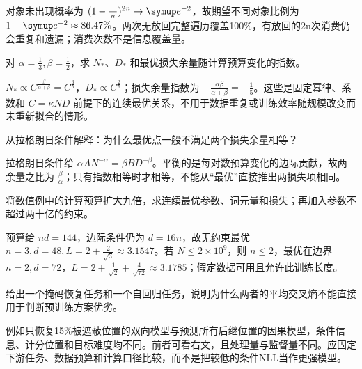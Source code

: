 \begin{exercises}
\begin{exercise}
\begin{solution}
对象未出现概率为 $(1-\frac{1}{n})^{2n}\to \conste{}^{-2}$，故期望不同对象比例为 $1-\conste{}^{-2}\approx86.47\%$。两次无放回完整遍历覆盖100\%，有放回的2n次消费仍会重复和遗漏；消费次数不是信息覆盖量。
\end{solution}
\end{exercise}

\begin{exercise} 对 $\alpha=\frac{1}{3},\beta=\frac{1}{2}$，求 $N_*$、$D_*$ 和最优损失余量随计算预算变化的指数。

\begin{solution}
$N_*\propto C^{\frac{\beta}{\alpha+\beta}}=C^{\frac{3}{5}}$，$D_*\propto C^{\frac{2}{5}}$；损失余量指数为 $-\frac{\alpha\beta}{\alpha+\beta}=-\frac{1}{5}$。这些是固定幂律、系数和 $C=\kappa ND$ 前提下的连续最优关系，不用于数据重复或训练效率随规模改变而未重新拟合的情形。
\end{solution}
\end{exercise}

\begin{exercise} 从拉格朗日条件解释：为什么最优点一般不满足两个损失余量相等？

\begin{solution}
拉格朗日条件给 $\alpha A N^{-\alpha}=\beta B D^{-\beta}$。平衡的是每对数预算变化的边际贡献，故两余量之比为 $\frac{\beta}{\alpha}$；只有指数相等时才相等，不能从“最优”直接推出两损失项相同。
\end{solution}
\end{exercise}

\begin{exercise} 将数值例中的计算预算扩大九倍，求连续最优参数、词元量和损失；再加入参数不超过两十亿的约束。

\begin{solution}
预算给 $nd=144$，边际条件仍为 $d=16n$，故无约束最优 $n=3,d=48,L=2+\frac{2}{\sqrt3}\approx3.1547$。若 $N\le2\times10^9$，则 $n\le2$，最优在边界 $n=2,d=72$，$L=2+\frac{1}{\sqrt2}+\frac{4}{\sqrt{72}}\approx3.1785$；假定数据可用且允许此训练长度。
\end{solution}
\end{exercise}

\begin{exercise} 给出一个掩码恢复任务和一个自回归任务，说明为什么两者的平均交叉熵不能直接用于判断预训练方案优劣。

\begin{solution}
例如只恢复15\%被遮蔽位置的双向模型与预测所有后继位置的因果模型，条件信息、计分位置和目标难度均不同。前者可看右文，且处理量与监督量不同。应固定下游任务、数据预算和计算口径比较，而不是把较低的条件NLL当作更强模型。
\end{solution}
\end{exercise}


\end{exercises}
